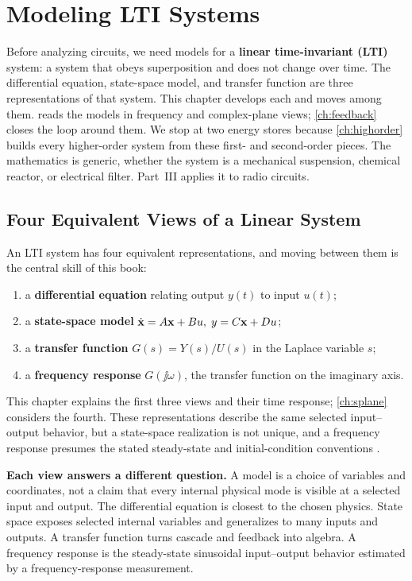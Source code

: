 \chapter{Modeling LTI Systems}
\label{ch:linsys}
Before analyzing circuits, we need models for a \textbf{linear time-invariant
(LTI)} system: a system that obeys superposition and does not change over time.
The differential equation, state-space model, and transfer function are three
representations of that system. This chapter develops each and moves among them.
 reads the models in frequency and complex-plane views;
\cref{ch:feedback} closes the loop around them. We stop at two energy stores
because \cref{ch:highorder} builds every higher-order system from these first-
and second-order pieces. The mathematics is generic, whether the system is a
mechanical suspension, chemical reactor, or electrical filter. Part~III applies
it to radio circuits.

\section{Four Equivalent Views of a Linear System}
An LTI system has four equivalent representations, and moving
between them is the central skill of this book:
\begin{enumerate}
\item a \textbf{differential equation} relating output \(y(t)\) to input \(u(t)\);
\item a \textbf{state-space model} \(\dot{\mathbf{x}}=A\mathbf{x}+Bu,\; y=C\mathbf{x}+Du\);
\item a \textbf{transfer function} \(G(s)=Y(s)/U(s)\) in the Laplace variable
\(s\);
\item a \textbf{frequency response} \(G(\jj\omega)\), the transfer function on the
imaginary axis.
\end{enumerate}
This chapter explains the first three views and their time response;
\cref{ch:splane} considers the fourth. These representations describe the same
selected input--output behavior, but a state-space realization is not unique, and
a frequency response presumes the stated steady-state and initial-condition
conventions \cite[pp.~199--203, 249--266]{leigh2012control}.

\begin{physicalbox}
\textbf{Each view answers a different question.} A model is a choice of variables
and coordinates, not a claim that every internal physical mode is visible at a
selected input and output. The differential equation is closest to the chosen
physics. State space exposes selected internal variables and generalizes to many
inputs and outputs. A transfer function turns cascade and feedback into algebra. A
frequency response is the steady-state sinusoidal input--output behavior estimated
by a frequency-response measurement.
\end{physicalbox}

